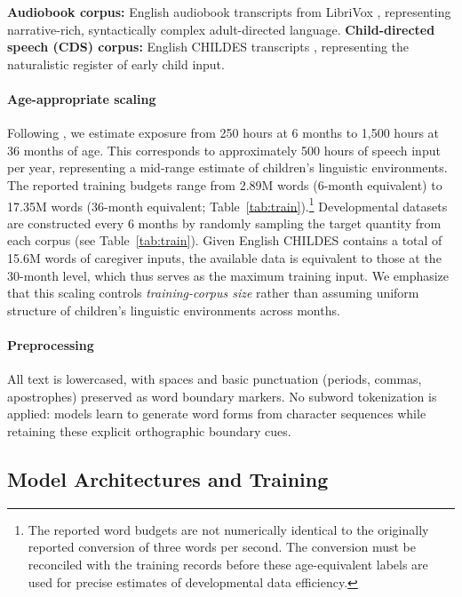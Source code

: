 \noindent\textbf{Audiobook corpus:} English audiobook transcripts from LibriVox \citep{kearns2014librivox}, representing narrative-rich, syntactically complex adult-directed language. \noindent\textbf{Child-directed speech (CDS) corpus:} English CHILDES transcripts \citep{macwhinney2000childes}, representing the naturalistic register of early child input.


\paragraph{Age-appropriate scaling} Following \citet{cristia2019child}, we estimate exposure from 250 hours at 6 months to 1,500 hours at 36 months of age. This corresponds to approximately 500 hours of speech input per year, representing a mid-range estimate of children's linguistic environments. The reported training budgets range from 2.89M words (6-month equivalent) to 17.35M words (36-month equivalent; Table~\ref{tab:train}).\footnote{The reported word budgets are not numerically identical to the originally reported conversion of three words per second. The conversion must be reconciled with the training records before these age-equivalent labels are used for precise estimates of developmental data efficiency.} Developmental datasets are constructed every 6 months by randomly sampling the target quantity from each corpus (see Table~\ref{tab:train}). Given English CHILDES contains a total of 15.6M words of caregiver inputs, the available data is equivalent to those at the 30-month level, which thus serves as the maximum training input. We emphasize that this scaling controls \emph{training-corpus size} rather than assuming uniform structure of children’s linguistic environments across months.



\paragraph{Preprocessing} All text is lowercased, with spaces and basic punctuation (periods, commas, apostrophes) preserved as word boundary markers. No subword tokenization is applied: models learn to generate word forms from character sequences while retaining these explicit orthographic boundary cues.

\subsection{Model Architectures and Training}

